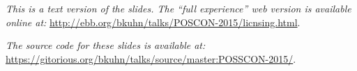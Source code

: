 \begin{center}
\textit{
This is a text version of the slides. The ``full experience'' web version is available
online at:} \url{http://ebb.org/bkuhn/talks/POSCON-2015/licnsing.html}.

\textit{The source code for these slides is available at:}
  \url{https://gitorious.org/bkuhn/talks/source/master:POSSCON-2015/}.

\end{center}
